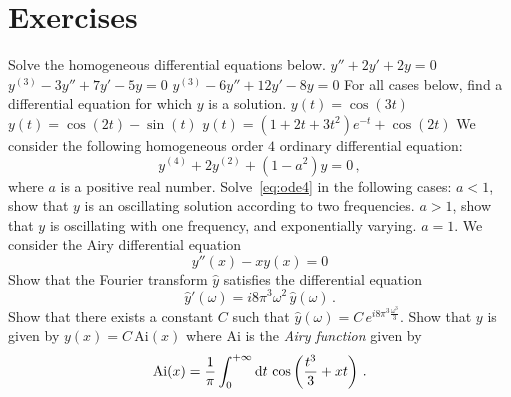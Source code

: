 \section{Exercises}
\begin{ExerciseList}
  \Exercise[label=ode-hom]
  Solve the homogeneous differential equations below.
  \Question $y''+2y'+2y=0$
  \Question $y^{(3)}-3y''+7y'-5y=0$
  \Question $y^{(3)}-6y''+12y'-8y=0$
  \Exercise[label=ode-rev]
  For all cases below, find a differential equation for which $y$ is a solution.
  \Question $y(t)=\cos(3t)$
  \Question $y(t)=\cos(2t)-\sin(t)$
  \Question $y(t)=(1+2t+3t^2)e^{-t}+\cos(2t)$
  \Exercise[label=ode4]
  We consider the following homogeneous order $4$ ordinary differential equation:
  \begin{equation}
    y^{(4)}+2y^{(2)}+(1-a^2)y=0\,,
    \label{eq:ode4}
  \end{equation}
  where $a$ is a positive real number.
  \Question Solve~\cref{eq:ode4} in the following cases:
  \subQuestion $a<1$, show that $y$ is an oscillating solution according
  to two frequencies.
  \subQuestion $a>1$, show that $y$ is oscillating with one frequency,
  and exponentially varying.
  \subQuestion $a=1$.
  \Exercise[label=airy]
  We consider the Airy differential equation
  \begin{equation}
    y''(x)-xy(x)=0
  \end{equation}
  \Question Show that the Fourier transform $\hat{y}$ satisfies the differential equation
  \begin{equation}
    \hat{y}'(\omega)=i8\pi^3\omega^2\,\hat{y}(\omega)\,.
  \end{equation}
  \Question Show that there exists a constant $C$ such that
  $\hat{y}(\omega)=C\,e^{i8\pi^3\frac{\omega^3}{3}}$.
  \Question Show that $y$ is given by $y(x)=C\,\mathrm{Ai}(x)$
  where $\mathrm{Ai}$ is the \emph{Airy function} given by
  \begin{equation}
    \mathrm{Ai}(x)=\frac{1}{\pi}\int_{0}^{+\infty}\mathrm{d} t\,\cos\left(\frac{t^3}{3}+xt\right)\,.
  \end{equation}

\end{ExerciseList}
